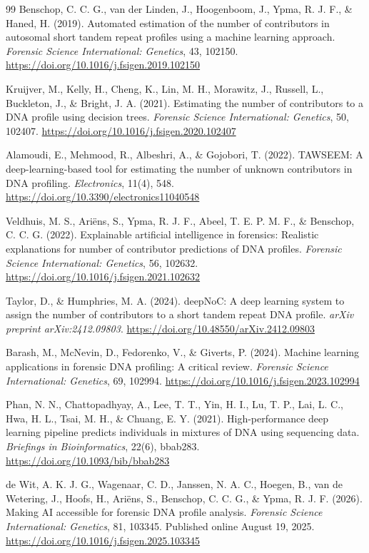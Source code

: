 \documentclass[12pt,a4paper]{article}
\begin{document}
\begin{thebibliography}{99}
Benschop, C. C. G., van der Linden, J., Hoogenboom, J., Ypma, R. J. F., \& Haned, H. (2019).
Automated estimation of the number of contributors in autosomal short tandem repeat profiles using a machine learning approach.
\textit{Forensic Science International: Genetics}, 43, 102150.
\url{https://doi.org/10.1016/j.fsigen.2019.102150}

Kruijver, M., Kelly, H., Cheng, K., Lin, M. H., Morawitz, J., Russell, L., Buckleton, J., \& Bright, J. A. (2021).
Estimating the number of contributors to a DNA profile using decision trees.
\textit{Forensic Science International: Genetics}, 50, 102407.
\url{https://doi.org/10.1016/j.fsigen.2020.102407}

Alamoudi, E., Mehmood, R., Albeshri, A., \& Gojobori, T. (2022).
TAWSEEM: A deep-learning-based tool for estimating the number of unknown contributors in DNA profiling.
\textit{Electronics}, 11(4), 548.
\url{https://doi.org/10.3390/electronics11040548}

Veldhuis, M. S., Ariëns, S., Ypma, R. J. F., Abeel, T. E. P. M. F., \& Benschop, C. C. G. (2022).
Explainable artificial intelligence in forensics: Realistic explanations for number of contributor predictions of DNA profiles.
\textit{Forensic Science International: Genetics}, 56, 102632.
\url{https://doi.org/10.1016/j.fsigen.2021.102632}

Taylor, D., \& Humphries, M. A. (2024).
deepNoC: A deep learning system to assign the number of contributors to a short tandem repeat DNA profile.
\textit{arXiv preprint arXiv:2412.09803}.
\url{https://doi.org/10.48550/arXiv.2412.09803}

Barash, M., McNevin, D., Fedorenko, V., \& Giverts, P. (2024).
Machine learning applications in forensic DNA profiling: A critical review.
\textit{Forensic Science International: Genetics}, 69, 102994.
\url{https://doi.org/10.1016/j.fsigen.2023.102994}

Phan, N. N., Chattopadhyay, A., Lee, T. T., Yin, H. I., Lu, T. P., Lai, L. C., Hwa, H. L., Tsai, M. H., \& Chuang, E. Y. (2021).
High-performance deep learning pipeline predicts individuals in mixtures of DNA using sequencing data.
\textit{Briefings in Bioinformatics}, 22(6), bbab283.
\url{https://doi.org/10.1093/bib/bbab283}

de Wit, A. K. J. G., Wagenaar, C. D., Janssen, N. A. C., Hoegen, B., van de Wetering, J., Hoofs, H., Ariëns, S., Benschop, C. C. G., \& Ypma, R. J. F. (2026).
Making AI accessible for forensic DNA profile analysis.
\textit{Forensic Science International: Genetics}, 81, 103345. Published online August 19, 2025.
\url{https://doi.org/10.1016/j.fsigen.2025.103345}


\end{thebibliography}
\end{document}
